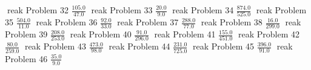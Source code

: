 \documentclass{article}
\begin{document}
\newline
\hfill reak
Problem 32
\newline
\hfill \break
$\displaystyle \frac{105.0}{47.0}$
\newline
\hfill reak
Problem 33
\newline
\hfill \break
$\displaystyle \frac{20.0}{9.0}$
\newline
\hfill reak
Problem 34
\newline
\hfill \break
$\displaystyle \frac{874.0}{525.0}$
\newline
\hfill reak
Problem 35
\newline
\hfill \break
$\displaystyle \frac{504.0}{11.0}$
\newline
\hfill reak
Problem 36
\newline
\hfill \break
$\displaystyle \frac{92.0}{33.0}$
\newline
\hfill reak
Problem 37
\newline
\hfill \break
$\displaystyle \frac{288.0}{77.0}$
\newline
\hfill reak
Problem 38
\newline
\hfill \break
$\displaystyle \frac{16.0}{299.0}$
\newline
\hfill reak
Problem 39
\newline
\hfill \break
$\displaystyle \frac{208.0}{253.0}$
\newline
\hfill reak
Problem 40
\newline
\hfill \break
$\displaystyle \frac{91.0}{296.0}$
\newline
\hfill reak
Problem 41
\newline
\hfill \break
$\displaystyle \frac{155.0}{451.0}$
\newline
\hfill reak
Problem 42
\newline
\hfill \break
$\displaystyle \frac{80.0}{259.0}$
\newline
\hfill reak
Problem 43
\newline
\hfill \break
$\displaystyle \frac{473.0}{98.0}$
\newline
\hfill reak
Problem 44
\newline
\hfill \break
$\displaystyle \frac{231.0}{725.0}$
\newline
\hfill reak
Problem 45
\newline
\hfill \break
$\displaystyle \frac{396.0}{91.0}$
\newline
\hfill reak
Problem 46
\newline
\hfill \break
$\displaystyle \frac{35.0}{9.0}$
\newline
\end{document}
